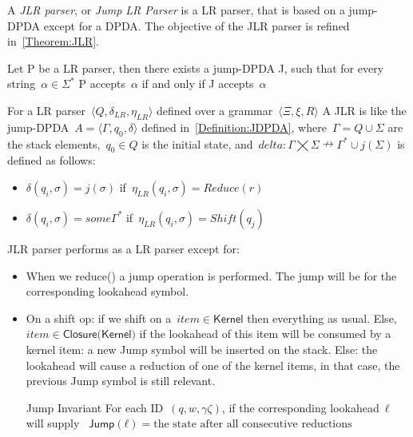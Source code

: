 A \emph{JLR parser}, or \emph{Jump LR Parser} is a LR parser, that 
  is based on a jump-DPDA except for a DPDA\@.
The objective of the JLR parser is refined in~\cref{Theorem:JLR}.
  
\begin{Theorem}
  \label{Theorem:JLR}
  Let P be a LR parser, then there exists a jump-DPDA J,
  such that for every string~$α∈Σ^*$
  P accepts~$α$ if and only if J accepts~$α$
\end{Theorem}

For a LR parser~$\langle Q , \delta_{LR} , η_{LR} \rangle$ defined over a grammar~$\langle \Xi , \xi , R \rangle$
A JLR is like the jump-DPDA~$A=⟨Γ,q_0,δ⟩$ defined in~\cref{Definition:JDPDA},
  where~$\Gamma = Q \cup \Sigma $ are the stack elements,~$q_0 \in Q$ is the initial state, and~$delta:Γ⨉Σ↛Γ^*∪j(\Sigma)$ is defined as follows:
  \begin{itemize}
   \item $\delta(q_i,\sigma)= j(\sigma)$ if~$\eta_{LR}(q_i,\sigma)=Reduce(r)$
   \item $\delta(q_i,\sigma)= some \Gamma^*$ if~$\eta_{LR}(q_i,\sigma)=Shift(q_j)$
  \end{itemize}


JLR parser performs as a LR parser except for:
\begin{itemize}
  \item When we \textsf{reduce()} a jump operation is performed.
    The jump will be for the corresponding lookahead symbol.

  \item On a shift op:
  if we shift on a~$item∈\textsf{Kernel}$
    then everything as usual.
  Else,~$item∈\textsf{Closure(Kernel)}$
      if the lookahead of this item will be consumed by a kernel item:
        a new Jump symbol will be inserted on the stack.
      Else:
        the lookahead will cause a reduction of one of the kernel items,
        in that case, the previous Jump symbol is still relevant.
  \item[Jump Invariant] For each ID~$(q,w,γζ)$, if the corresponding lookahead~$ℓ$ will supply
~$\textsf{Jump}(ℓ)= \text{the state after all consecutive reductions}$
\end{itemize}
